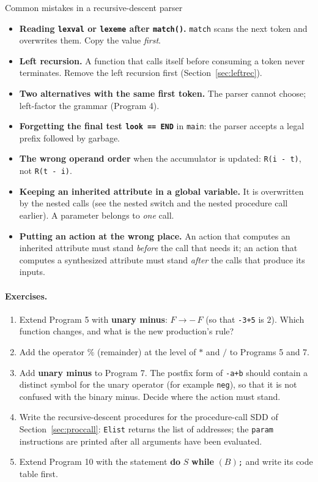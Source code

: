 \documentclass[11pt,a4paper]{article}
\begin{document}
\begin{pitfallbox}{Common mistakes in a recursive-descent parser}
\begin{itemize}[nosep]
\item \textbf{Reading \texttt{lexval} or \texttt{lexeme} after \texttt{match()}.} \texttt{match} scans the next token and overwrites them. Copy the value \emph{first}.
\item \textbf{Left recursion.} A function that calls itself before consuming a token never terminates. Remove the left recursion first (Section~\ref{sec:leftrec}).
\item \textbf{Two alternatives with the same first token.} The parser cannot choose; left-factor the grammar (Program 4).
\item \textbf{Forgetting the final test \texttt{look == END}} in \texttt{main}: the parser accepts a legal prefix followed by garbage.
\item \textbf{The wrong operand order} when the accumulator is updated: \texttt{R(i - t)}, not \texttt{R(t - i)}.
\item \textbf{Keeping an inherited attribute in a global variable.} It is overwritten by the nested calls (see the nested switch and the nested procedure call earlier). A parameter belongs to \emph{one} call.
\item \textbf{Putting an action at the wrong place.} An action that computes an inherited attribute must stand \emph{before} the call that needs it; an action that computes a synthesized attribute must stand \emph{after} the calls that produce its inputs.
\end{itemize}
\end{pitfallbox}

\paragraph{Exercises.}
\begin{enumerate}[nosep]
\item Extend Program 5 with \textbf{unary minus}: $F\to-\,F$ (so that \texttt{-3+5} is $2$). Which function changes, and what is the new production's rule?
\item Add the operator $\%$ (remainder) at the level of $*$ and $/$ to Programs 5 and 7.
\item Add \textbf{unary minus} to Program 7. The postfix form of \texttt{-a+b} should contain a distinct symbol for the unary operator (for example \texttt{neg}), so that it is not confused with the binary minus. Decide where the action must stand.
\item Write the recursive-descent procedures for the procedure-call SDD of Section~\ref{sec:proccall}: \texttt{Elist} returns the list of addresses; the \texttt{param} instructions are printed after all arguments have been evaluated.
\item Extend Program 10 with the statement \textbf{do} $S$ \textbf{while} $(B)$\texttt{;} and write its code table first.
\end{enumerate}
\end{document}
